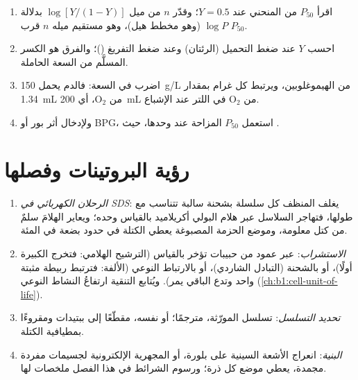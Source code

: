 \begin{method}\label{met:b1:proteins:hill}
\begin{enumerate}
  \item اقرأ $P_{50}$ من المنحني عند $Y = 0.5$؛ وقدّر $n$ من ميل
        $\log[Y/(1-Y)]$ بدلالة $\log P$ (وهو مخطط هيل)، وهو مستقيم
        ميله $n$ قرب $P_{50}$.
  \item احسب $Y$ عند ضغط التحميل (الرئتان) وعند ضغط التفريغ
        ()؛ والفرق هو الكسر المسلَّم من السعة الحاملة.
  \item اضرب في السعة: فالدم يحمل \qty{150}{g/L} من الهيموغلوبين،
        ويرتبط كل غرام بمقدار \qty{1.34}{mL} من $\mathrm{O_2}$، أي
        \qty{200}{mL} من $\mathrm{O_2}$ في اللتر عند الإشباع.
  \item ولإدخال أثر بور أو BPG، استعمل $P_{50}$ المزاحة عند 
        وحدها، حيث .
\end{enumerate}
\end{method}

\section{رؤية البروتينات وفصلها}

\begin{method}\label{met:b1:proteins:methods}
\begin{enumerate}
  \item \emph{الرحلان الكهربائي في SDS}: يغلف المنظف كل سلسلة بشحنة
        سالبة تتناسب مع طولها، فتهاجر السلاسل عبر هلام البولي
        أكريلاميد بالقياس وحده؛ ويعاير الهلامَ سلمٌ من كتل معلومة،
        وموضع الحزمة المصبوغة يعطي الكتلة في حدود بضعة في المئة.
  \item \emph{الاستشراب}: عبر عمود من حبيبات تؤخر  بالقياس
        (الترشيح الهلامي: فتخرج الكبيرة أولًا)، أو بالشحنة (التبادل
        الشاردي)، أو بالارتباط النوعي (الألفة: فترتبط ربيطة مثبتة
         واحد وتدع الباقي يمر). ويُتابع التنقية ارتفاعُ النشاط
        النوعي (\cref{ch:b1:cell-unit-of-life}).
  \item \emph{تحديد التسلسل}: تسلسل المورّثة، مترجمًا؛ أو 
        نفسه، مقطّعًا إلى ببتيدات ومقروءًا بمطيافية الكتلة.
  \item \emph{البنية}: انعراج الأشعة السينية على بلورة، أو المجهرية
        الإلكترونية لجسيمات مفردة مجمدة، يعطي موضع كل ذرة؛ ورسوم
        الشرائط في هذا الفصل ملخصات لها.
\end{enumerate}
\end{method}

